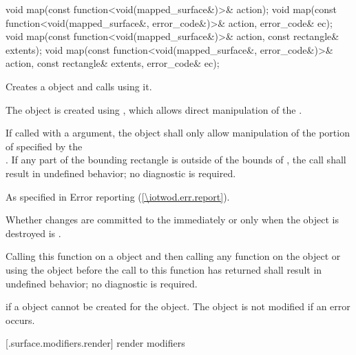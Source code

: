 %
%
\begin{itemdecl}
void map(const function<void(mapped_surface&)>& action);
void map(const function<void(mapped_surface&, error_code&)>& action, error_code& ec);
void map(const function<void(mapped_surface&)>& action, const rectangle& extents);
void map(const function<void(mapped_surface&, error_code&)>& action,
  const rectangle& extents, error_code& ec);
\end{itemdecl}
\begin{itemdescr}
\pnum
\effects
Creates a  object and calls  using it.

\pnum
The  object is created using , which allows direct manipulation of the \underlyingsurface.

\pnum
If called with a  argument, the  object shall only allow manipulation of the portion of  specified by the  \\
. If any part of the bounding rectangle is outside of the bounds of , the call shall result in undefined behavior; no diagnostic is required.

\pnum
\throws
As specified in Error reporting (\ref{\iotwod.err.report}).

\pnum
\remarks
Whether changes are committed to the \underlyingsurface immediately or only when the  object is destroyed is \unspecnorm.

\pnum
Calling this function on a  object and then calling any function on the  object or using the  object before the call to this function has returned shall result in undefined behavior; no diagnostic is required.

\pnum
\errors
{} if a  object cannot be created for the  object. The  object is not modified if an error occurs.
\end{itemdescr}

 [\iotwod.surface.modifiers.render] { render modifiers}

